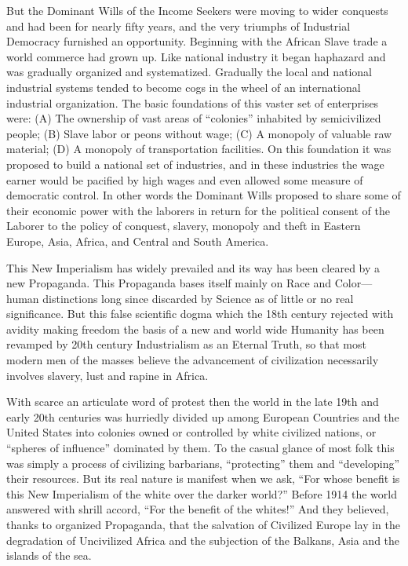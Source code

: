 \documentclass[letterpaper,10pt,english]{jupyterBook}
\begin{document}
\sphinxAtStartPar
But the Dominant Wills of the Income Seekers were moving to wider conquests and had been for nearly fifty years, and the very triumphs of Industrial Democracy furnished an opportunity. Beginning with the African Slave trade a world commerce had grown up. Like national industry it began haphazard and was gradually organized and systematized. Gradually the local and national industrial systems tended to become cogs in the wheel of an international industrial organization. The basic foundations of this vaster set of enterprises were: (A) The ownership of vast areas of “colonies” inhabited by semi\sphinxhyphen{}civilized people; (B) Slave labor or peons without wage; (C) A monopoly of valuable raw material; (D) A monopoly of transportation facilities. On this foundation it was proposed to build a national set of industries, and in these industries the wage earner would be pacified by high wages and even allowed some measure of democratic control. In other words the Dominant Wills proposed to share some of their economic power with the laborers in return for the political consent of the Laborer to the policy of conquest, slavery, monopoly and theft in Eastern Europe, Asia, Africa, and Central and South America.

\sphinxAtStartPar
This New Imperialism has widely prevailed and its way has been cleared by a new Propaganda. This Propaganda bases itself mainly on Race and Color—human distinctions long since discarded by Science as of little or no real significance. But this false scientific dogma which the 18th century rejected with avidity making freedom the basis of a new and world wide Humanity has been revamped by 20th century Industrialism as an Eternal Truth, so that most modern men of the masses believe the advancement of civilization necessarily involves slavery, lust and rapine in Africa.

\sphinxAtStartPar
With scarce an articulate word of protest then the world in the late 19th and early 20th centuries was hurriedly divided up among European Countries and the United States into colonies owned or controlled by white civilized nations, or “spheres of influence” dominated by them. To the casual glance of most folk this was simply a process of civilizing barbarians, “protecting” them and “developing” their resources. But its real nature is manifest when we ask, “For whose benefit is this New Imperialism of the white over the darker world?” Before 1914 the world answered with shrill accord, “For the benefit of the whites!” And they believed, thanks to organized Propaganda, that the salvation of Civilized Europe lay in the degradation of Uncivilized Africa and the subjection of the Balkans, Asia and the islands of the sea.
\end{document}
